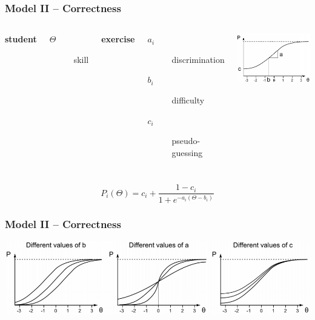 \documentclass[xcolor=svgnames]{beamer}
\begin{document}
\begin{frame}
	\frametitle{Model II -- Correctness}
	\begin{columns}
		\textbf{student}
		\begin{description}
			\item[$\Theta$]	skill
		\end{description}
		\textbf{exercise}
		\begin{description}
			\item[$a_i$] discrimination
			\item[$b_i$] difficulty
			\item[$c_i$] pseudo-guessing
		\end{description}
		\includegraphics[width=\textwidth]{2013-VV041-student-modeling/correctness-model.png}
	\end{columns}
	\begin{center}
		$$
		P_i(\Theta) = c_i + \frac{1 - c_i}{1 + e^{-a_i(\Theta - b_i)}}
		$$
	\end{center}
\end{frame}
\begin{frame}
	\frametitle{Model II -- Correctness}

	\begin{center}
		\includegraphics[width=.95\textwidth]{2013-VV041-student-modeling/correctness-model-types.png}
	\end{center}
\end{frame}
\end{document}
